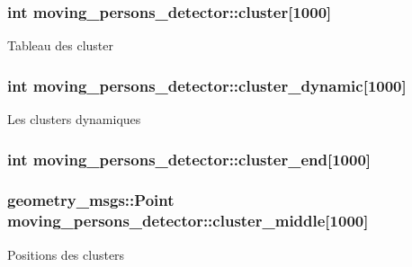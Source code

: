 \subsubsection[{\texorpdfstring{cluster}{cluster}}]{\setlength{\rightskip}{0pt plus 5cm}int moving\+\_\+persons\+\_\+detector\+::cluster\mbox{[}1000\mbox{]}\hspace{0.3cm}{\ttfamily [private]}}\hypertarget{classmoving__persons__detector_a8453207bfdcffd1e45ab9dcc73210e60}{}\label{classmoving__persons__detector_a8453207bfdcffd1e45ab9dcc73210e60}
Tableau des cluster 
\subsubsection[{\texorpdfstring{cluster\+\_\+dynamic}{cluster_dynamic}}]{\setlength{\rightskip}{0pt plus 5cm}int moving\+\_\+persons\+\_\+detector\+::cluster\+\_\+dynamic\mbox{[}1000\mbox{]}\hspace{0.3cm}{\ttfamily [private]}}\hypertarget{classmoving__persons__detector_a729d1bcf6929766ce3a6e6f5fe0a56d1}{}\label{classmoving__persons__detector_a729d1bcf6929766ce3a6e6f5fe0a56d1}
Les clusters dynamiques 
\subsubsection[{\texorpdfstring{cluster\+\_\+end}{cluster_end}}]{\setlength{\rightskip}{0pt plus 5cm}int moving\+\_\+persons\+\_\+detector\+::cluster\+\_\+end\mbox{[}1000\mbox{]}\hspace{0.3cm}{\ttfamily [private]}}\hypertarget{classmoving__persons__detector_a0d32b0ae38b8f9b26c007faabafe7450}{}\label{classmoving__persons__detector_a0d32b0ae38b8f9b26c007faabafe7450}
\subsubsection[{\texorpdfstring{cluster\+\_\+middle}{cluster_middle}}]{\setlength{\rightskip}{0pt plus 5cm}geometry\+\_\+msgs\+::\+Point moving\+\_\+persons\+\_\+detector\+::cluster\+\_\+middle\mbox{[}1000\mbox{]}\hspace{0.3cm}{\ttfamily [private]}}\hypertarget{classmoving__persons__detector_a4a961028d83e2d74b5af1e53593be67c}{}\label{classmoving__persons__detector_a4a961028d83e2d74b5af1e53593be67c}
Positions des clusters 

